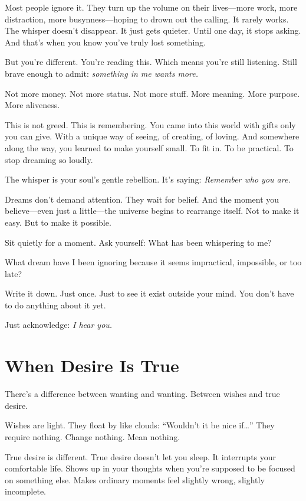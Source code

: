 \documentclass[11pt, a5paper, openright]{book}
\begin{document}
Most people ignore it. They turn up the volume on their lives—more work, more distraction, more busynness—hoping to drown out the calling. It rarely works. The whisper doesn't disappear. It just gets quieter. Until one day, it stops asking. And that's when you know you've truly lost something.

But you're different. You're reading this. Which means you're still listening. Still brave enough to admit: \textit{something in me wants more.}

Not more money. Not more status. Not more stuff. More meaning. More purpose. More aliveness.

This is not greed. This is remembering. You came into this world with gifts only you can give. With a unique way of seeing, of creating, of loving. And somewhere along the way, you learned to make yourself small. To fit in. To be practical. To stop dreaming so loudly.

The whisper is your soul's gentle rebellion. It's saying: \textit{Remember who you are.}

Dreams don't demand attention. They wait for belief. And the moment you believe—even just a little—the universe begins to rearrange itself. Not to make it easy. But to make it possible.

Sit quietly for a moment. Ask yourself: What has been whispering to me?

\begin{reflectionbox}
What dream have I been ignoring because it seems impractical, impossible, or too late?

Write it down. Just once. Just to see it exist outside your mind. You don't have to do anything about it yet.

Just acknowledge: \textit{I hear you.}
\end{reflectionbox}

\chapter{When Desire Is True}

There's a difference between wanting and wanting. Between wishes and true desire.

Wishes are light. They float by like clouds: ``Wouldn't it be nice if…'' They require nothing. Change nothing. Mean nothing.

True desire is different. True desire doesn't let you sleep. It interrupts your comfortable life. Shows up in your thoughts when you're supposed to be focused on something else. Makes ordinary moments feel slightly wrong, slightly incomplete.
\end{document}
